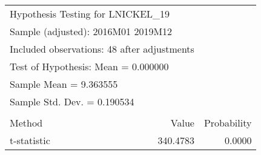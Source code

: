 \begin{tabular}{lrrr}
\toprule
\multicolumn{3}{l}{Hypothesis Testing for LNICKEL\_19}&\multicolumn{1}{c}{}\\
\multicolumn{3}{l}{Sample (adjusted): 2016M01 2019M12}&\multicolumn{1}{c}{}\\
\multicolumn{3}{l}{Included observations: 48 after adjustments}&\multicolumn{1}{c}{}\\
\multicolumn{3}{l}{Test of Hypothesis: Mean =  0.000000}&\multicolumn{1}{c}{}\\
\midrule
\multicolumn{2}{l}{Sample Mean =  9.363555}&\multicolumn{1}{c}{}&\multicolumn{1}{c}{}\\
\multicolumn{2}{l}{Sample Std. Dev. =  0.190534}&\multicolumn{1}{c}{}&\multicolumn{1}{c}{}\\
\multicolumn{1}{c}{}&\multicolumn{1}{c}{}&\multicolumn{1}{c}{}&\multicolumn{1}{c}{}\\
\multicolumn{1}{l}{Method}&\multicolumn{1}{c}{}&\multicolumn{1}{r}{Value}&\multicolumn{1}{r}{Probability}\\
\multicolumn{1}{l}{t-statistic}&\multicolumn{1}{c}{}&\multicolumn{1}{r}{340.4783}&\multicolumn{1}{r}{0.0000}\\
\bottomrule
\end{tabular}

